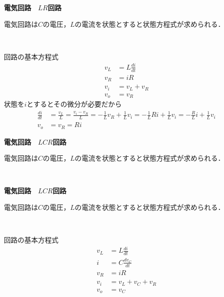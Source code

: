 \documentclass[a4paper,11pt]{jreport}
\begin{document}
\noindent
{\bf 電気回路　$LR$回路}

電気回路は$C$の電圧，$L$の電流を状態とすると状態方程式が求められる．
\begin{figure}[htbp]
 \begin{center}
 \end{center}
\end{figure}

回路の基本方程式
\begin{align*}
	v_L & = L \frac{d i}{dt} \\
	v_R &= i R \\
	v_i & = v_L + v_R \\
	v_o & = v_R
\end{align*}
状態を$i$とするとその微分が必要だから
\begin{align*}
	\frac{d i}{dt} 
	&= \frac{v_L}{L} 
	= \frac{v_i - v_R}{L} 
	= - \frac{1}{L} v_R + \frac{1}{L} v_i 
	= - \frac{1}{L} R i + \frac{1}{L} v_i 
	= - \frac{R}{L} i + \frac{1}{L} v_i \\
	v_o & = v_R = R i
\end{align*}


\newpage
\noindent
{\bf 電気回路　$LCR$回路}

電気回路は$C$の電圧，$L$の電流を状態とすると状態方程式が求められる．
\begin{figure}[htbp]
 \begin{center}
 \end{center}
\end{figure}


\newpage
\noindent
{\bf 電気回路　$LCR$回路}

電気回路は$C$の電圧，$L$の電流を状態とすると状態方程式が求められる．
\begin{figure}[htbp]
 \begin{center}
 \end{center}
\end{figure}

回路の基本方程式
\begin{align*}
	v_L & = L \frac{d i}{dt} \\
	i & = C \frac{d v_C}{dt} \\
	v_R &= i R \\
	v_i & = v_L + v_C + v_R \\
	v_o & = v_C
\end{align*}
\end{document}
